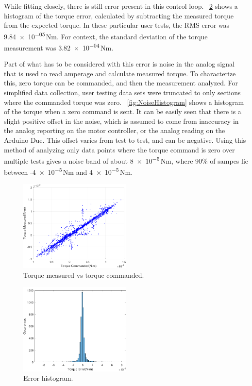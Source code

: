 \documentclass[11pt, letterpaper]{article}
\begin{document}
While fitting closely, there is still error present in this control loop. 
 \figurename~\ref{fig:ErrorHistogram} shows a histogram of the torque error, calculated by subtracting the measured torque from the expected torque.
In these particular user tests, the RMS error was \num{9.84e-05}\,Nm.
For context, the standard deviation of the torque measurement was \num{3.82e-04}\,Nm.


Part of what has to be considered with this error is noise in the analog signal that is used to read amperage and calculate measured torque.
To characterize this, zero torque can be commanded, and then the measurement analyzed.  
For simplified data collection, user testing data sets were truncated to only sections where the commanded torque was zero.
\figurename~\ref{fig:NoiseHistogram} shows a histogram of the torque when a zero command is sent.
It can be easily seen that there is a slight positive offset in the noise, which is assumed to come from inaccuracy in the analog reporting on the motor controller, or the analog reading on the Arduino Due.
This offset varies from test to test, and can be negative.
Using this method of analyzing only data points where the torque command is zero over multiple tests gives a noise band of about \num{8e-5}\,Nm, where 90\% of sampes lie between -\num{4e-5}\,Nm and \num{4e-5}\,Nm.

\begin{figure}[tb]
  \centering
  \includegraphics[width=0.5\textwidth]{diagrams/TorqueCommanded.pdf}
  \caption{Torque measured vs torque commanded.}
  \label{fig:TorqueCommanded}
\end{figure}

\begin{figure}[tb]
  \centering
  \includegraphics[width=0.5\textwidth]{diagrams/ErrorHistogram.pdf}
  \caption{Error histogram.}
  \label{fig:ErrorHistogram}
\end{figure}
\end{document}
